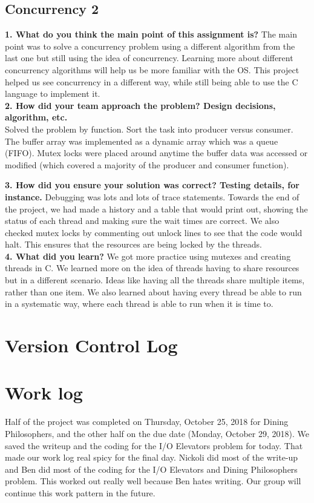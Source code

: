 \documentclass[10pt,english]{IEEEtran}
\begin{document}
\subsection{Concurrency 2}

\textbf{1. What do you think the main point of this assignment is?}
The main point was to solve a concurrency problem using a different algorithm from the last one but still using the idea of concurrency. Learning more about different concurrency algorithms will help us be more familiar with the OS. This project helped us see concurrency in a different way, while still being able to use the C language to implement it.  \\

\noindent \textbf{2. How did your team approach the problem? Design decisions, algorithm, etc.}
  \\

Solved the problem by function. Sort the task into producer versus consumer. The buffer array was implemented as a dynamic array which was a queue (FIFO). Mutex locks were placed around anytime the buffer data was accessed or modified (which covered a majority of the producer and consumer function).

\noindent \textbf{3. How did you ensure your solution was correct? Testing details, for instance.}
Debugging was lots and lots of trace statements. Towards the end of the project, we had made a history and a table that would print out, showing the status of each thread and making sure the wait times are correct. We also checked mutex locks by commenting out unlock lines to see that the code would halt. This ensures that the resources are being locked by the threads.  \\

\noindent \textbf{4. What did you learn?}
We got more practice using mutexes and creating threads in C. We learned more on the idea of threads having to share resources but in a different scenario. Ideas like having all the threads share multiple items, rather than one item. We also learned about having every thread be able to run in a systematic way, where each thread is able to run when it is time to.  \\

\section{Version Control Log}



\section{Work log}


Half of the project was completed on Thursday, October 25, 2018 for Dining Philosophers, and the other half on the due date (Monday, October 29, 2018). We saved the writeup and the coding for the I/O Elevators problem for today. That made our work log real spicy for the final day. Nickoli did most of the write-up and Ben did most of the coding for the I/O Elevators and Dining Philosophers problem. This worked out really well because Ben hates writing. Our group will continue this work pattern in the future. 
\end{document}
